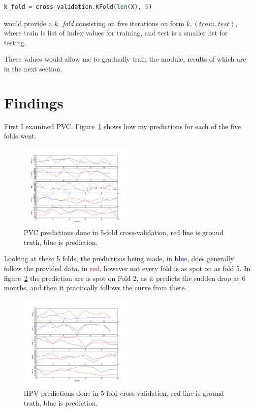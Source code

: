 \documentclass{sig-alternate}
\begin{document}
\begin{lstlisting}[language=Python]
k_fold = cross_validation.KFold(len(X), 5)
\end{lstlisting}

would provide a \textit{k\_fold} consisting on five iterations on form $k, (train, test)$, where train is list of index values for training, and test is a smaller list for testing.

These values would allow me to gradually train the module, results of which are in the next section.

\newpage

\section{Findings}
First I examined PVC. Figure~\ref{fig:PVC} shows how my predictions for each of the five folds went.
\begin{figure}[h!]
\centering
\includegraphics[width=0.5\textwidth]{PVC_Folds}
\caption{PVC predictions done in 5-fold cross-validation, red line is ground truth, blue is prediction.}
\label{fig:PVC}
\end{figure}
Looking at these 5 folds, the predictions being made, in \textcolor{blue}{blue}, does generally follow the provided data, in \textcolor{red}{red}, however not every fold is as spot on as fold 5. In figure~\ref{fig:HPV} the prediction are is spot on Fold 2, as it predicts the sudden drop at 6 months, and then it practically follows the curve from there.
\begin{figure}[h!]
\centering
\includegraphics[width=0.5\textwidth]{HPV_Folds}
\caption{HPV predictions done in 5-fold cross-validation, red line is ground truth, blue is prediction.}
\label{fig:HPV}
\end{figure}
\end{document}

